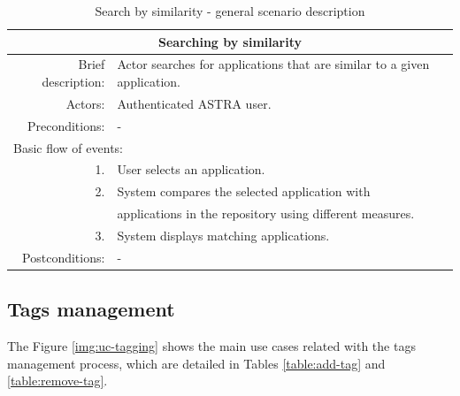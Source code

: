 \begin{table}[h!]
	\small
    \begin{center}
		\begin{tabular}{||r|l||}
		\hline \hline
		\multicolumn{2}{||c||}{\bfseries{Searching by similarity}} \\
		\hline
		\hline 
		Brief description: & Actor searches for applications that are similar to a
		given application.\\
		\hline
		Actors: & Authenticated ASTRA user. \\
		\hline
		Preconditions: &  - \\
		\hline \hline
		\multicolumn{2}{||l||}{Basic flow of events:} \\
		\hline \hline
			1. & User selects an application. \\
			2. & System compares the selected application with \\ 
			  & applications in the repository using different measures. \\ 
			3. & System displays matching applications.\\ 
		\hline \hline
		Postconditions: &  - \\
		\hline \hline
		\end{tabular}
		\caption{\label{table:search-similarity}Search by similarity - general
		scenario description}
	\end{center}
\end{table}



\clearpage

\subsection{Tags management}
\label{subsec:tags-use-cases}

The Figure \ref{img:uc-tagging} shows the main use cases related with the
tags management process, which are detailed in Tables \ref{table:add-tag}
and \ref{table:remove-tag}.

